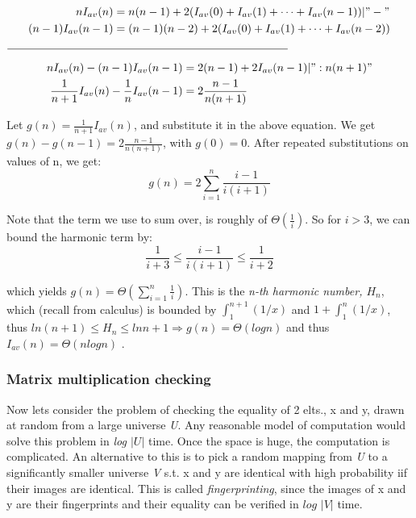 \documentclass[11pt]{article}
\begin{document}
\begin{equation}
\begin{split}
  nI_{av}(n) &= n(n - 1) + 2(I_{av}(0) + I_{av}(1) + \dots + I_{av}(n-1)) | "-" \\
(n-1)I_{av}(n-1)& = (n - 1)(n - 2) + 2(I_{av}(0) + I_{av}(1) + \dots + I_{av}(n-2))
\end{split}
\end{equation}

\begin{center}
$\line(1,0){250} $ 
\end{center}

\begin{equation}
\begin{split}
 nI_{av}(n) - (n - 1)I_{av}(n-1)& = 2(n - 1)  + 2I_{av}(n-1)  | ":n(n+1)" \\
  \frac{1}{n+1} I_{av}(n) - \frac{1}{n} I_{av}(n-1)& = 2 \frac{n-1}{n(n+1)}
\end{split}
\end{equation}

Let $g(n) = \frac{1}{n+1} I_{av}(n)$, and substitute it in the above equation. We get $g(n) - g(n-1) = 2 \frac{n-1}{n(n+1)}$, with $g(0) = 0$. After repeated substitutions on values of n, we get:
\begin{equation}
g(n) = 2 \sum_{i=1}^{n}\frac{i-1}{i(i+1)} 
\end{equation}

Note that the term we use to sum over, is roughly of $\Theta(\frac{1}{i})$. So for $i >3$, we can bound the harmonic term by: 
\begin{equation}
  \frac{1}{i+3} \leq \frac{i-1}{i(i+1)} \leq \frac{1}{i+2}
\end{equation}

which yields $g(n) = \Theta(\sum_{i=1}^{n}\frac{1}{i})$. This is the \textit{n-th harmonic number, $H_n$}, which (recall from calculus) is bounded by $\int_{1}^{n+1}(1/x)$ and $1 + \int_{1}^{n}(1/x)$, thus  $ ln(n+1) \leq H_n \leq ln n+1 \Rightarrow g(n) = \Theta(logn)$ and thus $I_{av}(n) = \Theta(nlogn)$ .


\subsubsection{Matrix multiplication checking}
Now lets consider the problem of checking the equality of 2 elts., x and y, drawn at random from a large universe \textit{U}. Any reasonable model of computation would solve this problem in \textit{log $\lvert U \lvert$} time. Once the space is huge, the computation is complicated. An alternative to this is to pick a random mapping from \textit{U} to a significantly smaller universe \textit{V} s.t. x and y are identical with high probability iif their images are identical. This is called \textit{fingerprinting}, since the images of x and y are their fingerprints and their equality can be verified in $\textit{log $\lvert V \lvert$}$ time. 
\end{document}
